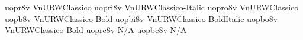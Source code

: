 \documentclass[test]{vnsample}
\begin{document}
\begin{shortsample}
  {uopr8v}   {VnURWClassico}
 {uopri8v}  {VnURWClassico-Italic}
 {uopro8v}  {VnURWClassico}
  {uopb8v}   {VnURWClassico-Bold}
 {uopbi8v}  {VnURWClassico-BoldItalic}
 {uopbo8v}  {VnURWClassico-Bold}
 {uoprc8v}  {N/A}
 {uopbc8v}  {N/A}
\end{shortsample}
\end{document}
